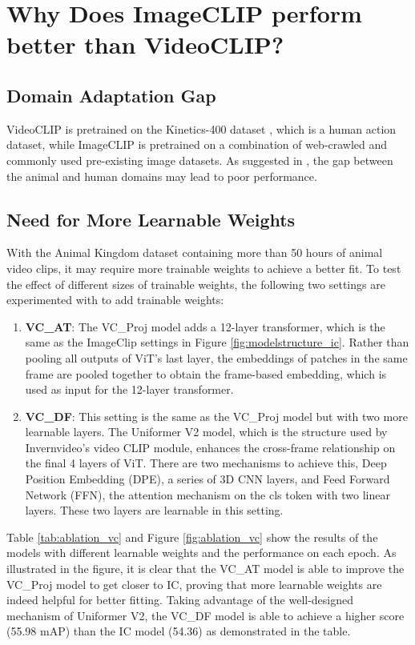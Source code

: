 \section{Why Does ImageCLIP perform better than VideoCLIP?}
\label{sec:discussion_vc}
\subsection{Domain Adaptation Gap}
VideoCLIP is pretrained on the Kinetics-400 dataset \parencite{kay2017kinetics}, which is a human action dataset, while ImageCLIP is pretrained on a combination of web-crawled and commonly used pre-existing image datasets. As suggested in \parencite{farahani2021brief}, the gap between the animal and human domains may lead to poor performance.

\subsection{Need for More Learnable Weights}
With the Animal Kingdom dataset containing more than 50 hours of animal video clips, it may require more trainable weights to achieve a better fit. To test the effect of different sizes of trainable weights, the following two settings are experimented with to add trainable weights:

\begin{enumerate}
    \item \textbf{VC\_AT}: The VC\_Proj model adds a 12-layer transformer, which is the same as the ImageClip settings in Figure \ref{fig:modelstructure_ic}. Rather than pooling all outputs of ViT's last layer, the embeddings of patches in the same frame are pooled together to obtain the frame-based embedding, which is used as input for the 12-layer transformer.
    \item \textbf{VC\_DF}: This setting is the same as the VC\_Proj model but with two more learnable layers. The Uniformer V2 model, which is the structure used by Invernvideo's video CLIP module, enhances the cross-frame relationship on the final 4 layers of ViT. There are two mechanisms to achieve this, Deep Position Embedding (DPE), a series of 3D CNN layers, and Feed Forward Network (FFN), the attention mechanism on the cls token with two linear layers. These two layers are learnable in this setting.
\end{enumerate}

Table \ref{tab:ablation_vc} and Figure \ref{fig:ablation_vc} show the results of the models with different learnable weights and the performance on each epoch. As illustrated in the figure, it is clear that the VC\_AT model is able to improve the VC\_Proj model to get closer to IC, proving that more learnable weights are indeed helpful for better fitting. Taking advantage of the well-designed mechanism of Uniformer V2, the VC\_DF model is able to achieve a higher score (55.98 mAP) than the IC model (54.36) as demonstrated in the table. 

